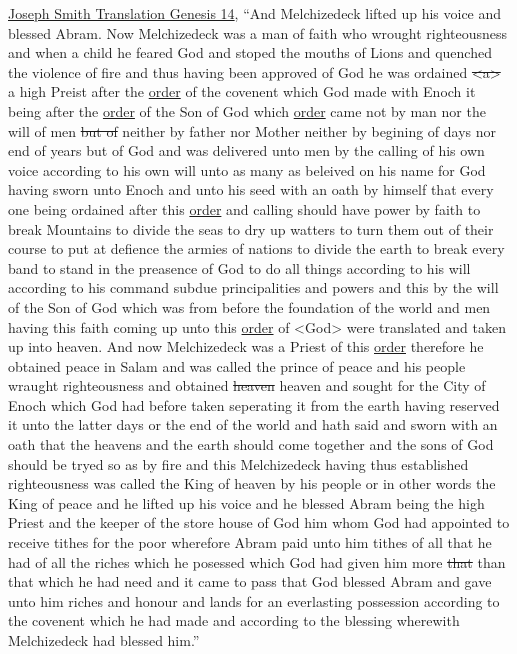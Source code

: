 \begin{compactitem}
\begin{compactitem}
					\item \hyperref[JST-OTR1-GENESIS-14]{Joseph Smith Translation Genesis 14}, ``And Melchizedeck lifted up his voice and blessed Abram. Now Melchizedeck was a man of faith who wrought righteousness and when a child he feared God and stoped the mouths of Lions and quenched the violence of fire and thus having been approved of God he was ordained \sout{<a>} a high Preist after the \hyperref[ORDER]{order} of the covenent which God made with Enoch it being after the \hyperref[ORDER]{order} of the Son of God which \hyperref[ORDER]{order} came not by man nor the will of men \sout{but of} neither by father nor Mother neither by begining of days nor end of years but of God and was delivered unto men by the calling of his own voice according to his own will unto as many as beleived on his name for God having sworn unto Enoch and unto his seed with an oath by himself that every one being ordained after this \hyperref[ORDER]{order} and calling should have power by faith to break Mountains to divide the seas to dry up watters to turn them out of their course to put at defience the armies of nations to divide the earth to break every band to stand in the preasence of God to do all things according to his will according to his command subdue principalities and powers and this by the will of the Son of God which was from before the foundation of the world and men having this faith coming up unto this \hyperref[ORDER]{order} of <God> were translated and taken up into heaven. And now Melchizedeck was a Priest of this \hyperref[ORDER]{order} therefore he obtained peace in Salam and was called the prince of peace and his people wraught righteousness and obtained \sout{heaven} heaven and sought for the City of Enoch which God had before taken seperating it from the earth having reserved it unto the latter days or the end of the world and hath said and sworn with an oath that the heavens and the earth should come together and the sons of God should be tryed so as by fire and this Melchizedeck having thus established righteousness was called the King of heaven by his people or in other words the King of peace and he lifted up his voice and he blessed Abram being the high Priest and the keeper of the store house of God him whom God had appointed to receive tithes for the poor wherefore Abram paid unto him tithes of all that he had of all the riches which he posessed which God had given him more \sout{that} than that which he had need and it came to pass that God blessed Abram and gave unto him riches and honour and lands for an everlasting possession according to the covenent which he had made and according to the blessing wherewith Melchizedeck had blessed him.''
				\end{compactitem}
			

\end{compactitem}
